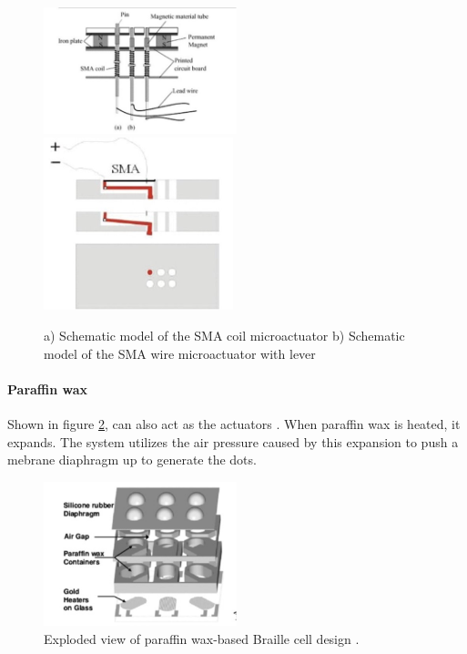 \begin{figure}[h]\centering
    \includegraphics[width=0.5\textwidth]{figures/sma-coil.png}
    \includegraphics[height=5cm]{figures/sma-mechanism.png}
    \caption{ a) Schematic model of the SMA coil microactuator b) Schematic model of the SMA wire microactuator with lever}
    \label{fig:sma}
\end{figure}

\paragraph{Paraffin wax}
Shown in figure \ref{fig:paraffin}, can also act as the actuators \cite{lee_micromachined_2005}. When paraffin wax is heated, it expands.
The system utilizes the air pressure caused by this expansion to push a mebrane diaphragm up to generate the dots.

\begin{figure}[h] \centering
    \includegraphics[width=0.5\textwidth]{figures/paraffin.png}
\caption{Exploded view of paraffin wax-based Braille cell design \cite{lee_micromachined_2005}.}
\label{fig:paraffin}
\end{figure}
